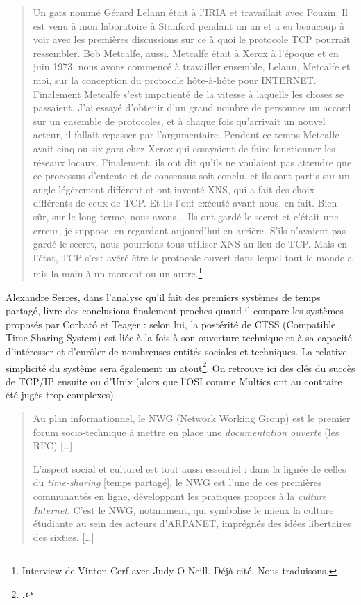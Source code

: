 \documentclass{FramateX}
\begin{document}
\begin{refsection}
\begin{quote}
Un gars nommé Gérard Lelann était à l'IRIA et
travaillait avec Pouzin. Il est venu à mon laboratoire à Stanford
pendant un an et a eu beaucoup à voir avec les premières discussions
sur ce à quoi le protocole TCP pourrait ressembler. Bob Metcalfe,
aussi. Metcalfe était à Xerox à l'époque et en juin
1973, nous avons commencé à travailler ensemble, Lelann, Metcalfe et
moi, sur la conception du protocole hôte-à-hôte pour INTERNET.
Finalement Metcalfe s'est impatienté de la vitesse à
laquelle les choses se passaient. J'ai essayé
d'obtenir d'un grand nombre de
personnes un accord sur un ensemble de protocoles, et à chaque fois
qu'arrivait un nouvel acteur, il fallait repasser par
l'argumentaire. Pendant ce temps Metcalfe avait cinq
ou six gars chez Xerox qui essayaient de faire fonctionner les réseaux
locaux. Finalement, ils ont dit qu'ils ne voulaient
pas attendre que ce processus d'entente et de
consensus soit conclu, et ils sont partis sur un angle légèrement
différent et ont inventé XNS, qui a fait des choix différents de ceux
de TCP. Et ils l'ont exécuté avant nous, en fait. Bien
sûr, sur le long terme, nous avons... Ils ont gardé le secret et
c'était une erreur, je suppose, en regardant
aujourd'hui en arrière. S'ils
n'avaient pas gardé le secret, nous pourrions tous
utiliser XNS au lieu de TCP. Mais en l'état, TCP
s'est avéré être le protocole ouvert dans lequel tout
le monde a mis la main à un moment ou un autre.\footnote{Interview de Vinton Cerf avec Judy O Neill. Déjà cité. Nous traduisons.}
\end{quote}

Alexandre Serres, dans l'analyse qu'il
fait des premiers systèmes de temps partagé, livre des conclusions
finalement proches quand il compare les systèmes proposés par Corbató
et Teager : selon lui, la postérité de CTSS (Compatible Time Sharing
System) est liée à la fois à son ouverture technique et à sa capacité
d'intéresser et d'enrôler de
nombreuses entités sociales et techniques. La relative simplicité du
système sera également un atout\footnote{\cite[p.~447]{serresaux2000}.}. On
retrouve ici des clés du succès de TCP/IP ensuite ou
d'Unix (alors que l'OSI comme Multics
ont au contraire été jugés trop complexes). 

\begin{quote}
Au plan informationnel, le NWG (Network Working Group) est le premier forum socio-technique à mettre en place une \textit{documentation ouverte} (les RFC) [\ldots].

L'aspect social et culturel est tout aussi essentiel :
dans la lignée de celles du \textit{time-sharing} [temps partagé], le
NWG est l'une de ces premières communautés en ligne,
développant les pratiques propres à la \textit{culture
Internet}. C'est le NWG, notamment,
qui symbolise le mieux la culture étudiante au sein des acteurs
d'ARPANET, imprégnés des idées libertaires des sixties. [\ldots] 


\end{quote}
\end{refsection}
\end{document}
